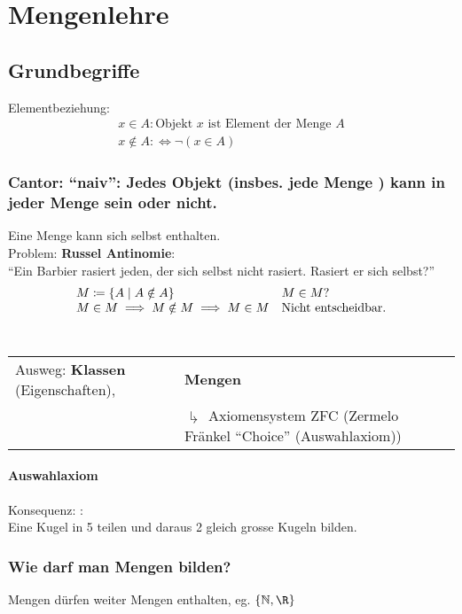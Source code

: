 \chapter{Mengenlehre}
\section{Grundbegriffe}
Elementbeziehung:\\
\begin{gather*}
	x \in A : \text{Objekt } x \text{ ist Element der Menge } A \\
	x \notin A : \iff \neg ( x \in A )
\end{gather*}

\subsection{Cantor: \enquote{naiv}: Jedes Objekt (insbes. jede Menge ) kann in jeder Menge sein oder nicht.}
Eine Menge kann sich selbst enthalten.\\
Problem: \textbf{Russel Antinomie}:\\
\enquote{Ein Barbier rasiert jeden, der sich selbst nicht rasiert. Rasiert er sich selbst?} \\
\begin{gather*}
	\begin{array}{ l l }
		M \coloneqq \{ A \mid A \notin A \}			& M \in M ?				\\
		M \in M \implies M \notin M \implies M \in M	&\text{Nicht entscheidbar.}	
	\end{array}
\end{gather*}\\
\begin{tabular}{ l p{7cm} }
Ausweg: \textbf{Klassen}\index{Klasse} (Eigenschaften),	&\textbf{Mengen}\index{Menge} \\
										& $\drsh$ Axiomensystem ZFC (Zermelo Fränkel \enquote{Choice} (Auswahlaxiom))
\end{tabular}

\subsubsection{Auswahlaxiom}
Konsequenz: : \\
Eine Kugel in 5 teilen und daraus 2 gleich grosse Kugeln bilden.

\subsection{Wie darf man Mengen bilden?}
Mengen dürfen weiter Mengen enthalten, eg. $\{ \N , \R \}$

